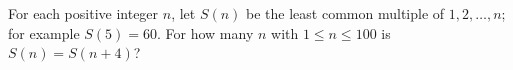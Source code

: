 For each positive integer $n$, let $S(n)$ be the least common multiple of $1,2,\dots,n$; for example $S(5)=60$. For how many $n$ with $1\le n\le100$ is $S(n)=S(n+4)$?
